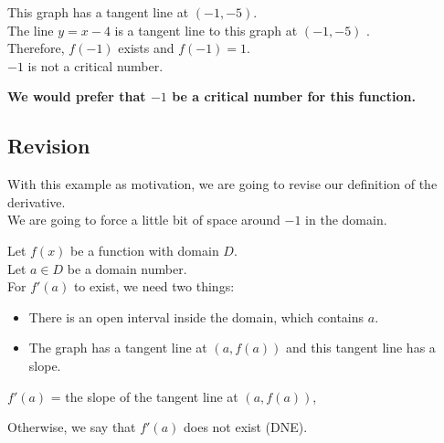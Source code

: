 \documentclass{ximera}
\begin{document}
This graph has a tangent line at $(-1,-5)$.  \\

The line $y = x - 4$ is a tangent line to this graph at $(-1,-5)$ . \\

Therefore, $f(-1)$ exists and $f(-1) = 1$.  \\

$-1$ is not a critical number. \\


\begin{center}
\textbf{\textcolor{red!80!black}{We would prefer that $-1$ be a critical number for this function.}}
\end{center}














\subsection{Revision}


With this example as motivation, we are going to revise our definition of the derivative. \\


We are going to force a little bit of space around $-1$ in the domain. \\




\begin{definition}

Let $f(x)$ be a function with domain $D$. \\
Let $a \in D$ be a domain number. \\



For $f'(a)$ to exist, we need two things:

\begin{itemize}
\item There is an open interval inside the domain, which contains $a$.
\item The graph has a tangent line at $(a, f(a))$ and this tangent line has a slope.
\end{itemize}



\begin{center}

$f'(a)$ = the slope of the tangent line at $(a, f(a))$,

\end{center}



Otherwise, we say that $f'(a)$ does not exist (DNE).






\end{definition}
\end{document}
